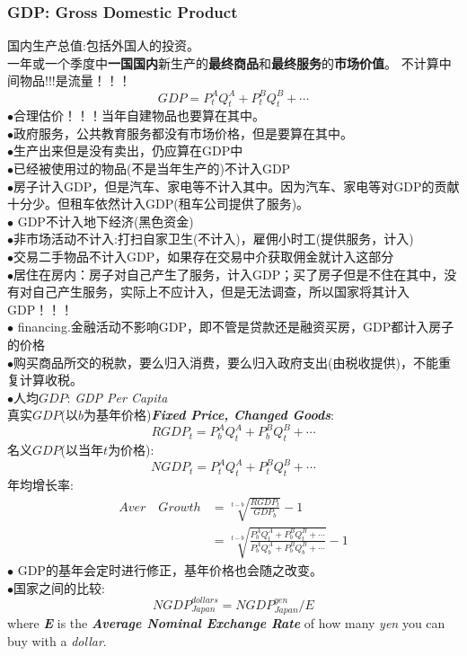 \documentclass[UTF8, onecolumn, a4paper, 12pt]{article}
\begin{document}
\subsubsection{GDP: Gross Domestic Product}
国内生产总值:包括外国人的投资。\\
一年或一个季度中{\bfseries 一国国内}新生产的{\bfseries 最终商品}和{\bfseries 最终服务}的{\bfseries 市场价值}。
不计算中间物品!!!是流量！！！
$$GDP = P_t^AQ_t^A + P_t^BQ_t^B+\cdots$$
$\bullet$合理估价！！！当年自建物品也要算在其中。\\
$\bullet$政府服务，公共教育服务都没有市场价格，但是要算在其中。\\
$\bullet$生产出来但是没有卖出，仍应算在GDP中\\
$\bullet$已经被使用过的物品(不是当年生产的)不计入GDP\\
$\bullet$房子计入GDP，但是汽车、家电等不计入其中。因为汽车、家电等对GDP的贡献十分少。但租车依然计入GDP(租车公司提供了服务)。\\
$\bullet$ GDP不计入地下经济(黑色资金)\\
$\bullet$非市场活动不计入:打扫自家卫生(不计入)，雇佣小时工(提供服务，计入)\\
$\bullet$交易二手物品不计入GDP，如果存在交易中介获取佣金就计入这部分\\
$\bullet$居住在房内：房子对自己产生了服务，计入GDP；买了房子但是不住在其中，没有对自己产生服务，实际上不应计入，但是无法调查，所以国家将其计入GDP！！！\\
$\bullet$ financing.金融活动不影响GDP，即不管是贷款还是融资买房，GDP都计入房子的价格\\
$\bullet$购买商品所交的税款，要么归入消费，要么归入政府支出(由税收提供)，不能重复计算收税。\\
$\bullet$人均$GDP$: \textit{GDP Per Capita}\\
真实$GDP$(以$b$为基年价格)\textit{\textbf{Fixed Price, Changed Goods}}:
$$RGDP_t = P_b^AQ_t^A + P_b^BQ_t^B + \cdots$$
名义$GDP$(以当年$t$为价格):
$$NGDP_t = P_t^AQ_t^A + P_t^BQ_t^B + \cdots$$
年均增长率:
\begin{equation}
\begin{aligned}
Aver\quad Growth &= \sqrt[t-b]{\frac{RGDP_t}{GDP_b}} - 1 \\&= \sqrt[t-b]{\frac{P_b^AQ_t^A + P_b^BQ_t^B + \cdots}{P_b^AQ_b^A + P_b^BQ_b^B + \cdots}} - 1
\end{aligned}
\end{equation}
$\bullet$ GDP的基年会定时进行修正，基年价格也会随之改变。\\
$\bullet$国家之间的比较:
$$NGDP_{Japan}^{dollars} = NGDP_{Japan}^{yen} / E$$  
where \textit{\textbf{E}} is the \textit{\textbf{Average Nominal Exchange Rate}} of how many \textit{yen} you can buy with a \textit{dollar}.
\end{document}
